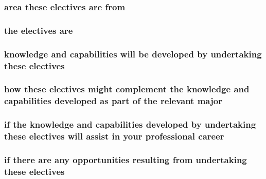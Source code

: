 \documentclass[../draft.tex]{subfiles}
\begin{document}
\subsubsection{area these electives are from}
\subsubsection{the electives are}
\subsubsection{knowledge and capabilities will be developed by undertaking these electives} 
\subsubsection{how these electives might complement the knowledge and capabilities developed as part of the relevant major}
\subsubsection{if the knowledge and capabilities developed by undertaking these electives will assist in your professional career}
\subsubsection{if there are any opportunities resulting from undertaking these electives}
\end{document}
